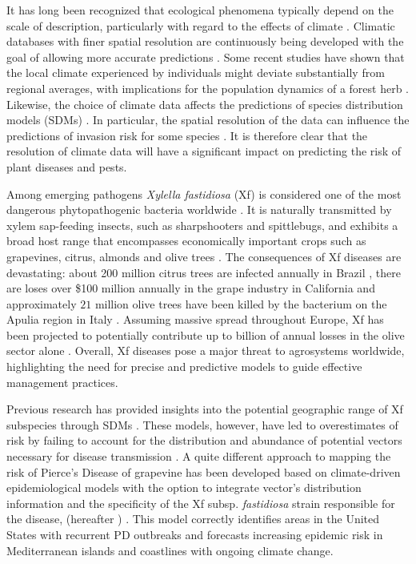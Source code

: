 It has long  been recognized that ecological phenomena typically depend on
the scale of description,  particularly with regard to the effects of climate
\cite{Levin1992}. Climatic databases with finer spatial resolution are
continuously being developed with the goal of allowing more accurate
predictions \cite{Navarro-Racines2020}.  Some recent studies have shown that
the local climate experienced by individuals might deviate substantially from
regional averages, with implications for the population dynamics of a forest
herb \cite{Christiansen2024}. Likewise, the choice of climate data affects the
predictions of species distribution models (SDMs) \cite{Abdulwahab2022}. In
particular, the spatial resolution of the data can influence the predictions of
invasion risk for some species \cite{Dubos2023}.  It is therefore clear that
the resolution of climate data will have a significant impact on predicting the
risk of plant diseases and pests.

Among emerging pathogens \textit{Xylella fastidiosa} (Xf) is considered one
of the most dangerous phytopathogenic bacteria worldwide
\cite{Hopkins2002,EFSA_xf}. It is naturally transmitted by xylem sap-feeding
insects, such as sharpshooters and spittlebugs, and exhibits a broad host range
that encompasses economically important crops such as grapevines, citrus,
almonds and olive trees \cite{Redak2004,EFSA_xf}. The consequences of Xf
diseases are devastating: about 200 million citrus trees are  infected annually
in Brazil \cite{Lindow2019}, there are	loses over \$100 million annually in
the grape industry in California  \cite{Tumber2014} and approximately
$21$ million olive trees have been killed by the bacterium on the Apulia region
in Italy  \cite{Sabelli2023}. Assuming massive spread throughout Europe, Xf has
been projected to potentially contribute up to  billion of annual
losses in the olive sector alone \cite{Schneider2020}. Overall, Xf diseases
pose a major threat to agrosystems worldwide, highlighting the need for precise
and predictive models to guide effective management practices.

Previous research has provided insights into the potential geographic range
of Xf subspecies through SDMs \cite{Bosso2016b, Godefroid2022}. These models,
however, have led to overestimates of risk by failing to account for the
distribution and abundance of potential vectors necessary for disease
transmission  \cite{Godefroid2022_vector}.  A quite different approach to
mapping the risk of Pierce's Disease of grapevine has been developed based on
climate-driven epidemiological models with the option to integrate vector's
distribution information and the specificity of the Xf subsp.
\textit{fastidiosa} strain responsible for the disease,
(hereafter \xf{}) \cite{GimenezRomero2022_CommsBio}. This model correctly
identifies areas in the United States with recurrent  PD outbreaks and
forecasts increasing epidemic risk in Mediterranean islands and coastlines
with ongoing climate change.

